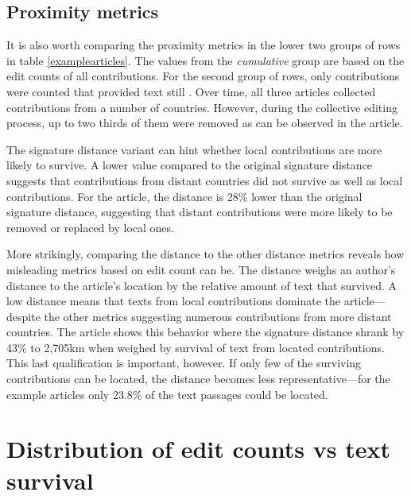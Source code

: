 \subsection{Proximity metrics}

It is also worth comparing the proximity metrics in the lower two groups of rows in table \ref{examplearticles}.
The values from the \emph{cumulative} group are based on the edit counts of all contributions.
For the second group of rows, only contributions were counted that provided text still .
Over time, all three articles collected contributions from a number of countries. 
However, during the collective editing process, up to two thirds of them were removed as can be observed in the  article. 

The signature distance variant  can hint whether local contributions are more likely to survive.
A lower  value compared to the original signature distance suggests that contributions from distant countries did not survive as well as local contributions.
For the  article, the  distance is 28\% lower than  the original signature distance, suggesting that distant contributions were more likely to be removed or replaced by local ones.

More strikingly, comparing the  distance to the other distance metrics reveals how misleading metrics based on edit count can be.
The  distance weighs an author's distance to the article's location by the relative amount of text that survived.
A low  distance means that texts from local contributions dominate the article---despite the other metrics suggesting numerous contributions from more distant countries.
The  article shows this behavior where the signature distance shrank by 43\% to 2,705km when weighed by survival of text from located contributions. 
This last qualification is important, however.
If only few of the surviving contributions can be located, the  distance becomes less representative---for the example articles only 23.8\% of the text passages could be located.


\section{Distribution of edit counts vs text survival}\label{sec:editcountvstextsurvival}

